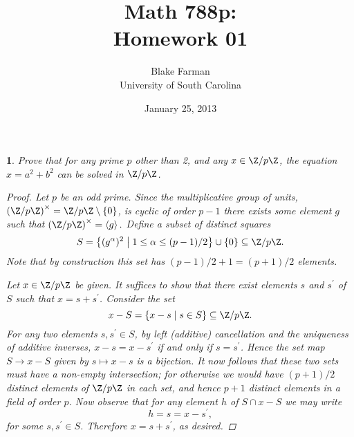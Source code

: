 \documentclass[10pt]{amsart}
\author{Blake Farman\\University of South Carolina}
\title{Math 788p:\\Homework 01}
\date{January 25, 2013}
\begin{document}
\maketitle

\providecommand{\p}{\mathfrak{p}}
\providecommand{\m}{\mathfrak{m}}

\newtheorem{thm}{}
\newtheorem{lem}{Lemma}

\begin{thm}
  Prove that for any prime $p$ other than 2, and any $x \in \Z/p\Z$, the equation $x = a^2 + b^2$ can be solved in $\Z/p\Z$.
  \begin{proof}
    Let $p$ be an odd prime.
    Since the multiplicative group of units, $\left(\Z/p\Z\right)^\times = \Z/p\Z \setminus \left\{0\right\}$, is cyclic of order $p-1$ there exists some element $g$ such that $\left(\Z/p\Z\right)^\times = \left<g\right>.$
    Define a subset of distinct squares $$S = \left\{(g^\alpha)^2 \;\middle\vert\; 1 \leq \alpha \leq (p-1)/2 \right\} \cup \left\{0\right\} \subseteq \Z/p\Z.$$
    Note that by construction this set has $(p-1)/2 + 1 = (p + 1)/2$ elements.
    
    Let $x \in \Z/p\Z$ be given.
    It suffices to show that there exist elements $s$ and $s^\prime$ of $S$ such that $x = s + s^\prime$.
    Consider the set
    $$x - S = \left\{x - s \;\middle\vert\; s \in S\right\} \subseteq \Z/p\Z.$$
    For any two elements $s, s^\prime \in S$, by left (additive) cancellation and the uniqueness of additive inverses, $x - s = x - s^\prime$ if and only if $s = s^\prime$.
    Hence the set map $S \rightarrow x - S$ given by $s \mapsto x - s$ is a bijection.
    It now follows that these two sets must have a non-empty intersection; for otherwise we would have $(p + 1) / 2$ distinct elements of $\Z/p\Z$ in each set, and hence $p + 1$ distinct elements in a field of order $p$.
    Now observe that for any element $h$ of $S \cap x - S$ we may write $$h = s = x - s^\prime,$$ for some $s,s^\prime \in S$. 
    Therefore $x = s + s^\prime$, as desired.
  \end{proof}
\end{thm}
\end{document}
